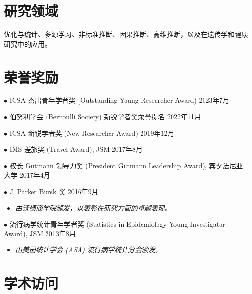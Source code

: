 \documentclass[margin, line]{res}
\begin{document}
\begin{resume}
		\section{\sc 研究领域}
		优化与统计、多源学习、非标准推断、因果推断、高维推断，以及在遗传学和健康研究中的应用。

		\section{\sc 荣誉奖励}

        $\bullet$ ICSA 杰出青年学者奖 (Outstanding Young Researcher Award) \hfill{2023年7月}

        \vspace{-3mm}

        $\bullet$ 伯努利学会 (Bernoulli Society) 新锐学者奖荣誉提名 \hfill{2022年11月}

        \vspace{-3mm}

        $\bullet$ ICSA 新锐学者奖 (New Researcher Award) \hfill{2019年12月}

        \vspace{-3mm}

        $\bullet$ IMS 差旅奖 (Travel Award), JSM \hfill{2017年8月}

        \vspace{-3mm}

        $\bullet$ 校长 Gutmann 领导力奖 (President Gutmann Leadership Award), 宾夕法尼亚大学 \hfill{2017年4月}

        \vspace{-3mm}

        $\bullet$ J. Parker Bursk 奖 \hfill{2016年9月}
        \begin{itemize}
            \item[] {\it 由沃顿商学院颁发，以表彰在研究方面的卓越表现。}
        \end{itemize}
        \vspace{-3mm}

        $\bullet$ 流行病学统计青年学者奖 (Statistics in Epidemiology Young Investigator Award), JSM \hfill{2013年8月}
        \begin{itemize}
            \item[] {\it 由美国统计学会 (ASA) 流行病学统计分会颁发。}
        \end{itemize}

        \section{\sc 学术访问}


\end{resume}
\end{document}
